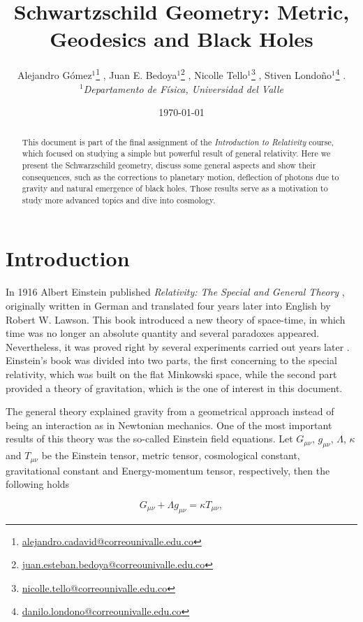 \documentclass[letterpaper,11pt,onecolumn]{article}
\title{Schwartzschild Geometry: Metric, Geodesics and Black Holes}
\author{ Alejandro Gómez$^1$\thanks{\href{mailto:alejandro.cadavid@correounivalle.edu.co}{alejandro.cadavid@correounivalle.edu.co}} , Juan E. Bedoya$^1$\thanks{\href{mailto:juan.esteban.bedoya@correounivalle.edu.co}{juan.esteban.bedoya@correounivalle.edu.co}} , Nicolle Tello$^1$\thanks{\href{mailto:nicolle.tello@correounivalle.edu.co}{nicolle.tello@correounivalle.edu.co}} , Stiven Londoño$^1$\thanks{\href{mailto:danilo.londono@correounivalle.edu.co}{danilo.londono@correounivalle.edu.co}} . \\ $^1$\textit{Departamento de Física, Universidad del Valle} }
\date{\today}
\begin{document}
\maketitle

\begin{abstract}
    This document is part of the final assignment of the \textit{Introduction to Relativity} course, which focused on studying a simple but powerful result of general relativity. Here we present the Schwarzschild geometry, discuss some general aspects and show their consequences, such as the corrections to planetary motion, deflection of photons due to gravity and natural emergence of black holes. Those results serve as a motivation to study more advanced topics and dive into cosmology. 
    
\end{abstract}

\tableofcontents

\newpage


\section{Introduction}\label{intro}

In 1916 Albert Einstein published \emph{Relativity: The Special and General Theory} \cite{einstein_uber_2009}, originally written in German and translated four years later into English by Robert W. Lawson. This book introduced a new theory of space-time, in which time was no longer an absolute quantity and several paradoxes appeared. Nevertheless, it was proved right by several experiments carried out years later \cite{hobson_efstathiou_lasenby_2006}. Einstein's book was divided into two parts, the first concerning to the special relativity, which was built on the flat Minkowski space, while the second part provided a theory of gravitation, which is the one of interest in this document. 

The general theory explained gravity from a geometrical approach instead of being an interaction as in Newtonian mechanics. One of the most important results of this theory was the so-called Einstein field equations. Let $G_{\mu \nu}$, $ g_{\mu \nu}$, $\Lambda$, $\kappa$ and $T_{\mu \nu}$ be the Einstein tensor, metric tensor, cosmological constant, gravitational constant and Energy-momentum tensor, respectively, then the following holds

\begin{equation} \label{field}
    G_{\mu \nu} + \Lambda g_{\mu \nu} = \kappa T_{\mu \nu},
\end{equation}
\end{document}
